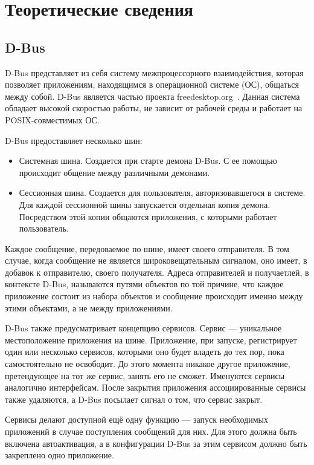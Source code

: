 \section{Теоретические сведения}
\subsection{D-Bus}
D-Bus представляет из себя систему межпроцессорного взаимодействия, которая позволяет приложениям, находящимся в операционной системе (ОС), общаться между собой. D-Bus является частью проекта freedesktop.org~\cite{DBus}. Данная система обладает высокой скоростью работы, не зависит от рабочей среды и работает на POSIX-совместимых ОС.

D-Bus предоставляет несколько шин:
\begin{itemize}
\item Системная шина. Создается при старте демона D-Bus. С ее помощью происходит общение между различными демонами. 
\item Сессионная шина. Создается для пользователя, авторизовавшегося в системе. Для каждой сессионной шины запускается отдельная копия демона. Посредством этой копии общаются приложения, с которыми работает пользователь.
\end{itemize}

Каждое сообщение, передоваемое по шине, имеет своего отправителя. В том случае, когда сообщение не является широковещательным сигналом, оно имеет, в добавок к отправителю, своего получателя. Адреса отправителей и получаетлей, в контексте D-Bus, называются путями объектов по той причине, что каждое приложение состоит из набора объектов и сообщение происходит именно между этими объектами, а не между приложениями.

D-Bus также предусматривает концепцию сервисов. Сервис — уникальное местоположение приложения на шине. Приложение, при запуске, регистрирует один или несколько сервисов, которыми оно будет владеть до тех пор, пока самостоятельно не освободит. До этого момента никакое другое приложение, претендующее на тот же сервис, занять его не сможет. Именуются сервисы аналогично интерфейсам. После закрытия приложения ассоциированные сервисы также удаляются, а D-Bus посылает сигнал о том, что сервис закрыт.

Сервисы делают доступной ещё одну функцию — запуск необходимых приложений в случае поступления сообщений для них. Для этого должна быть включена автоактивация, а в конфигурации D-Bus за этим сервисом должно быть закреплено одно приложение.

